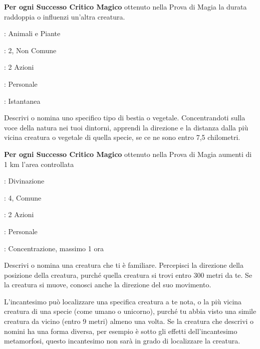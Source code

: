 \begin{multicols}{2}
\textbf{Per ogni Successo Critico Magico} ottenuto nella Prova di Magia la durata raddoppia o influenzi un'altra creatura.

\noindent\colorbox{OBSSgold!10}{
\begin{minipage}{0.95\linewidth}
\begin{description}[noitemsep, topsep=0pt, parsep=0pt, partopsep=0pt, leftmargin=0cm, labelwidth=1.3cm]
	\item[\textbf{Lista}]: Animali e Piante
	\item[\textbf{Livello}]: 2, Non Comune
	\item[\textbf{Lancio}]: 2 Azioni
	\item[\textbf{Gittata}]: Personale
	\item[\textbf{Durata}]: Istantanea
\end{description}
\end{minipage}}\smallskip

Descrivi o nomina uno specifico tipo di bestia o vegetale. Concentrandoti sulla voce della natura nei tuoi dintorni, apprendi la direzione e la distanza dalla più vicina creatura o vegetale di quella specie, se ce ne sono entro 7,5 chilometri.

\textbf{Per ogni Successo Critico Magico} ottenuto nella Prova di Magia aumenti di 1 km l'area controllata

\noindent\colorbox{OBSSgold!10}{
\begin{minipage}{0.95\linewidth}
\begin{description}[noitemsep, topsep=0pt, parsep=0pt, partopsep=0pt, leftmargin=0cm, labelwidth=1.3cm]
	\item[\textbf{Lista}]: Divinazione
	\item[\textbf{Livello}]: 4, Comune
	\item[\textbf{Lancio}]: 2 Azioni
	\item[\textbf{Gittata}]: Personale
	\item[\textbf{Durata}]: Concentrazione, massimo 1 ora
\end{description}
\end{minipage}}\smallskip

Descrivi o nomina una creatura che ti è familiare. Percepisci la direzione della posizione della creatura, purché quella creatura si trovi entro 300 metri da te. Se la creatura si muove, conosci anche la direzione del suo movimento.

L'incantesimo può localizzare una specifica creatura a te nota, o la più vicina creatura di una specie (come umano o unicorno), purché tu abbia visto una simile creatura da vicino (entro 9 metri) almeno una volta. Se la creatura che descrivi o nomini ha una forma diversa, per esempio è sotto gli effetti dell'incantesimo metamorfosi, questo incantesimo non sarà in grado di localizzare la creatura.


\end{multicols}
